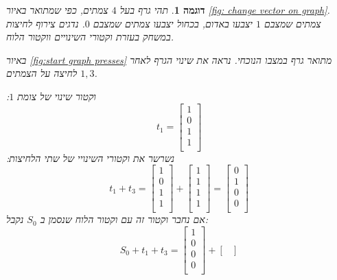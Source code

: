 \documentclass[12pt,leqno]{article}
\theoremstyle{theoremdd}
\newtheorem{example}{דוגמה}[section]
\begin{document}
\begin{example}
    תהי גרף בעל 
    $4$
    צמתים,
    כפי שמתואר באיור
    \ref{fig: change vector on graph}.
    צמתים שמצבם 
    $1$
    יצבעו באדום,
    בכחול 
    יצבעו צמתים שמצבם 
    $0$.
    נדגים צירוף לחיצות במשחק 
    בעזרת וקטורי השינויים ווקטור הלוח.


    באיור
    \ref{fig:start graph presses}
    מתואר גרף במצבו הנוכחי.
    נראה את שינוי הגרף לאחר לחיצה על הצמתים 
    $1, 3$.
 
    וקטור שינוי של צומת 
    $1$:
    \[
        t_1 = 
        \begin{bmatrix}
            1 \\
            0 \\
            1 \\
            1 \\
        \end{bmatrix}
    \]
    נשרשר את וקטורי השינויי של שתי הלחיצות:
    \[
        t_1 + t_3 = 
        \begin{bmatrix}
            1 \\
            0 \\
            1 \\
            1 \\
        \end{bmatrix}
        +
        \begin{bmatrix}
            1 \\
            1 \\
            1 \\
            1 \\
        \end{bmatrix}
        =
        \begin{bmatrix}
            0 \\
            1 \\
            0 \\
            0 \\
        \end{bmatrix}
    \]
    אם נחבר וקטור זה עם וקטור הלוח שנסמן ב
    $S_0$
    נקבל:
    \[
        S_0 + t_1 + t_3 = 
        \begin{bmatrix}
            1 \\
            0 \\
            0 \\
            0 \\
        \end{bmatrix}
        +
        \begin{bmatrix}

\end{bmatrix}\]
\end{example}
\end{document}
